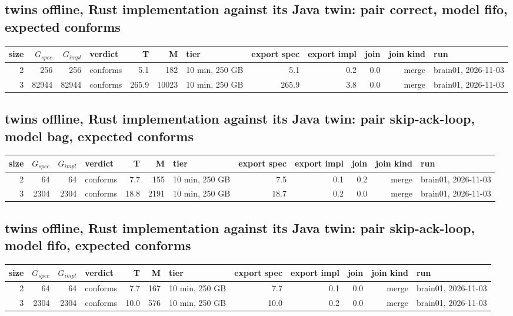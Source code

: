 \documentclass[10pt]{article}
\begin{document}
\subsection*{twins offline, Rust implementation against its Java twin: pair \textsf{correct}, model fifo, expected conforms}
\begin{longtable}{@{}rrrlrrlrrrrl@{}}
\toprule
size & $G_{\mathit{spec}}$ & $G_{\mathit{impl}}$ & verdict & T & M & tier & export spec & export impl & join & join kind & run \\
\midrule
\endhead
\color{blue} 2 & 256 & 256 & conforms & 5.1 & 182 & 10 min, 250 GB & 5.1 & 0.2 & 0.0 & merge & brain01, 2026-11-03 \\
\color{blue} 3 & 82944 & 82944 & conforms & 265.9 & 10023 & 10 min, 250 GB & 265.9 & 3.8 & 0.0 & merge & brain01, 2026-11-03 \\
\bottomrule
\end{longtable}
\subsection*{twins offline, Rust implementation against its Java twin: pair \textsf{skip-ack-loop}, model bag, expected conforms}
\begin{longtable}{@{}rrrlrrlrrrrl@{}}
\toprule
size & $G_{\mathit{spec}}$ & $G_{\mathit{impl}}$ & verdict & T & M & tier & export spec & export impl & join & join kind & run \\
\midrule
\endhead
\color{blue} 2 & 64 & 64 & conforms & 7.7 & 155 & 10 min, 250 GB & 7.5 & 0.1 & 0.2 & merge & brain01, 2026-11-03 \\
\color{blue} 3 & 2304 & 2304 & conforms & 18.8 & 2191 & 10 min, 250 GB & 18.7 & 0.2 & 0.0 & merge & brain01, 2026-11-03 \\
\bottomrule
\end{longtable}
\subsection*{twins offline, Rust implementation against its Java twin: pair \textsf{skip-ack-loop}, model fifo, expected conforms}
\begin{longtable}{@{}rrrlrrlrrrrl@{}}
\toprule
size & $G_{\mathit{spec}}$ & $G_{\mathit{impl}}$ & verdict & T & M & tier & export spec & export impl & join & join kind & run \\
\midrule
\endhead
\color{blue} 2 & 64 & 64 & conforms & 7.7 & 167 & 10 min, 250 GB & 7.7 & 0.1 & 0.0 & merge & brain01, 2026-11-03 \\
\color{blue} 3 & 2304 & 2304 & conforms & 10.0 & 576 & 10 min, 250 GB & 10.0 & 0.2 & 0.0 & merge & brain01, 2026-11-03 \\
\bottomrule
\end{longtable}
\end{document}

